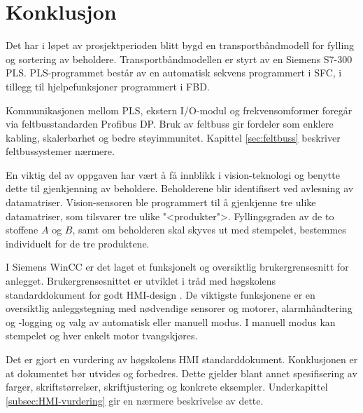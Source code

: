 \documentclass[Visionprosjekt.tex]{subfiles}
\begin{document}
 
  
\section{Konklusjon}


Det har i løpet av prosjektperioden blitt bygd  en transportbåndmodell for fylling og sortering av beholdere. Transportbåndmodellen er styrt av en Siemens S7-300 PLS. PLS-programmet består av en automatisk sekvens programmert i SFC, i tillegg til hjelpefunksjoner programmert i   FBD.  

Kommunikasjonen mellom PLS, ekstern I/O-modul og frekvensomformer foregår via feltbusstandarden Profibus DP. Bruk av feltbuss gir fordeler som enklere kabling, skalerbarhet og bedre støyimmunitet. Kapittel \ref{sec:feltbuss} beskriver feltbussystemer nærmere.


En viktig del av oppgaven har vært å få innblikk i vision-teknologi og benytte  dette til gjenkjenning av beholdere.  Beholderene blir identifisert ved avlesning av datamatriser. 
Vision-sensoren   ble programmert til å gjenkjenne tre ulike datamatriser, som tilsvarer tre ulike "<produkter">. Fyllingsgraden av de to stoffene $A$ og $B$, samt om beholderen skal skyves ut med stempelet, bestemmes individuelt for de tre produktene. %





I Siemens WinCC er det laget et funksjonelt og oversiktlig brukergrensesnitt for anlegget. Brukergrensesnittet er utviklet i tråd med  høgskolens standarddokument  for godt HMI-design \cite{HMIstandard}.  De viktigste funksjonene er en oversiktlig anleggstegning med nødvendige sensorer og motorer, alarmhåndtering og -logging og valg av automatisk eller manuell modus. I manuell modus kan stempelet og hver enkelt motor  tvangskjøres. 





Det er gjort en vurdering av høgskolens HMI standarddokument. Konklusjonen er at dokumentet bør utvides og forbedres. Dette gjelder  blant annet  spesifisering av farger, skriftstørrelser, skriftjustering og konkrete eksempler. Underkapittel \ref{subsec:HMI-vurdering} gir en nærmere beskrivelse av dette.
\end{document}
